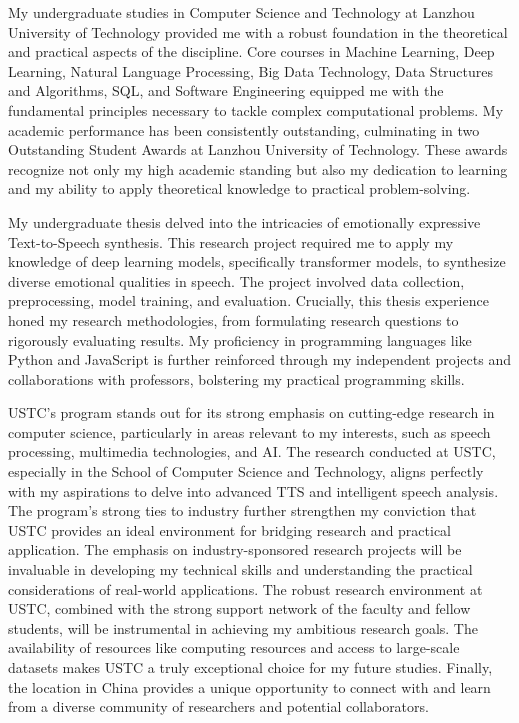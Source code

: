 \documentclass[12pt,a4paper]{article}
\begin{document}
\begin{CJK*}{UTF8}{gbsn}
My undergraduate studies in Computer Science and Technology at Lanzhou University of Technology provided me with a robust foundation in the theoretical and practical aspects of the discipline. Core courses in Machine Learning, Deep Learning, Natural Language Processing, Big Data Technology, Data Structures and Algorithms, SQL, and Software Engineering equipped me with the fundamental principles necessary to tackle complex computational problems. My academic performance has been consistently outstanding, culminating in two Outstanding Student Awards at Lanzhou University of Technology. These awards recognize not only my high academic standing but also my dedication to learning and my ability to apply theoretical knowledge to practical problem-solving.\newline

My undergraduate thesis delved into the intricacies of emotionally expressive Text-to-Speech synthesis. This research project required me to apply my knowledge of deep learning models, specifically transformer models, to synthesize diverse emotional qualities in speech. The project involved data collection, preprocessing, model training, and evaluation. Crucially, this thesis experience honed my research methodologies, from formulating research questions to rigorously evaluating results. My proficiency in programming languages like Python and JavaScript is further reinforced through my independent projects and collaborations with professors, bolstering my practical programming skills.\newline

USTC's program stands out for its strong emphasis on cutting-edge research in computer science, particularly in areas relevant to my interests, such as speech processing, multimedia technologies, and AI. The research conducted at USTC, especially in the School of Computer Science and Technology, aligns perfectly with my aspirations to delve into advanced TTS and intelligent speech analysis. The program's strong ties to industry further strengthen my conviction that USTC provides an ideal environment for bridging research and practical application. The emphasis on industry-sponsored research projects will be invaluable in developing my technical skills and understanding the practical considerations of real-world applications. The robust research environment at USTC, combined with the strong support network of the faculty and fellow students, will be instrumental in achieving my ambitious research goals. The availability of resources like computing resources and access to large-scale datasets makes USTC a truly exceptional choice for my future studies. Finally, the location in China provides a unique opportunity to connect with and learn from a diverse community of researchers and potential collaborators.\newline


\end{CJK*}
\end{document}
